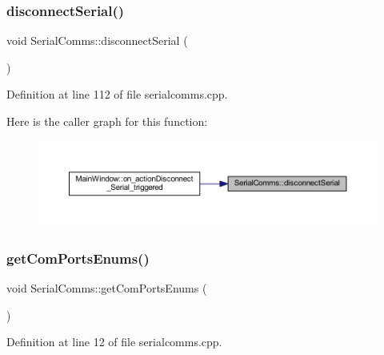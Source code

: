 \subsubsection{\texorpdfstring{disconnectSerial()}{disconnectSerial()}}
{\footnotesize\ttfamily void Serial\+Comms\+::disconnect\+Serial (\begin{DoxyParamCaption}{ }\end{DoxyParamCaption})}



Definition at line 112 of file serialcomms.\+cpp.

Here is the caller graph for this function\+:
\nopagebreak
\begin{figure}[H]
\begin{center}
\leavevmode
\includegraphics[width=350pt]{class_serial_comms_a437fbaf140deae42fa64d914f8d13ec8_icgraph}
\end{center}
\end{figure}
\mbox{\label{class_serial_comms_acea35603a9438747302b04f0b0a81312}} 
\subsubsection{\texorpdfstring{getComPortsEnums()}{getComPortsEnums()}}
{\footnotesize\ttfamily void Serial\+Comms\+::get\+Com\+Ports\+Enums (\begin{DoxyParamCaption}{ }\end{DoxyParamCaption})\hspace{0.3cm}{\ttfamily [private]}}



Definition at line 12 of file serialcomms.\+cpp.

